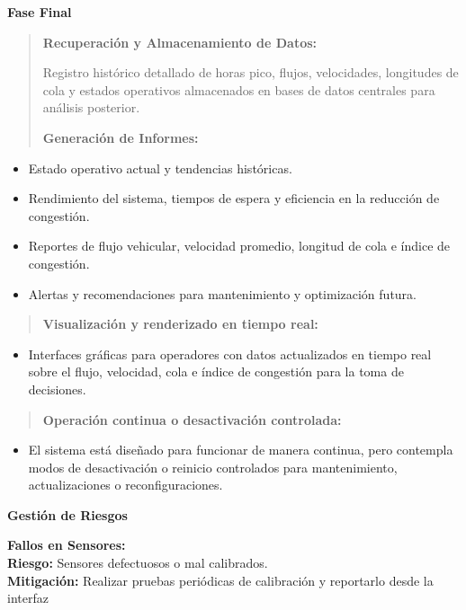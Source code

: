\documentclass[12pt,a4paper,oneside]{report}
\begin{document}
\textbf{Fase Final}

\begin{quote}
\textbf{Recuperación y Almacenamiento de Datos:}

Registro histórico detallado de horas pico, flujos, velocidades, longitudes de cola y estados operativos almacenados en bases de datos centrales para análisis posterior.

\textbf{Generación de Informes:}
\end{quote}

\begin{itemize}
\item
  Estado operativo actual y tendencias históricas.
\item
  Rendimiento del sistema, tiempos de espera y eficiencia en la reducción de congestión.
\item
  Reportes de flujo vehicular, velocidad promedio, longitud de cola e índice de congestión.
\item
  Alertas y recomendaciones para mantenimiento y optimización futura.
\end{itemize}

\begin{quote}
\textbf{Visualización y renderizado en tiempo real:}
\end{quote}

\begin{itemize}
\item
  Interfaces gráficas para operadores con datos actualizados en tiempo real sobre el flujo, velocidad, cola e índice de congestión para la toma de decisiones.
\end{itemize}

\begin{quote}
\textbf{Operación continua o desactivación controlada:}
\end{quote}

\begin{itemize}
\item
  El sistema está diseñado para funcionar de manera continua, pero contempla modos de desactivación o reinicio controlados para mantenimiento, actualizaciones o reconfiguraciones.
\end{itemize}

\textbf{Gestión de Riesgos}

\textbf{Fallos en Sensores:\\
Riesgo:} Sensores defectuosos o mal calibrados.\\
\textbf{Mitigación:} Realizar pruebas periódicas de calibración y reportarlo desde la interfaz
\end{document}
